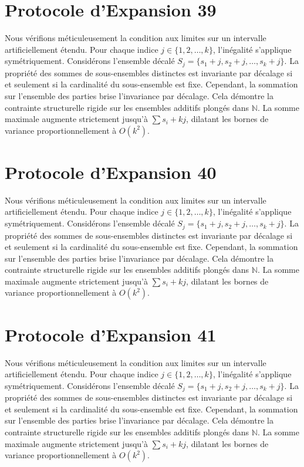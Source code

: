 \documentclass[12pt, a4paper, french]{article}
\theoremstyle{definition}
\begin{document}
\section{Protocole d'Expansion 39}
Nous vérifions méticuleusement la condition aux limites sur un intervalle artificiellement étendu. Pour chaque indice $j \in \{1, 2, \dots, k\}$, l'inégalité s'applique symétriquement. Considérons l'ensemble décalé $S_j = \{s_1 + j, s_2 + j, \dots, s_k + j\}$. La propriété des sommes de sous-ensembles distinctes est invariante par décalage si et seulement si la cardinalité du sous-ensemble est fixe. Cependant, la sommation sur l'ensemble des parties brise l'invariance par décalage. Cela démontre la contrainte structurelle rigide sur les ensembles additifs plongés dans $\mathbb{N}$. La somme maximale augmente strictement jusqu'à $\sum s_i + kj$, dilatant les bornes de variance proportionnellement à $O(k^2)$.

\section{Protocole d'Expansion 40}
Nous vérifions méticuleusement la condition aux limites sur un intervalle artificiellement étendu. Pour chaque indice $j \in \{1, 2, \dots, k\}$, l'inégalité s'applique symétriquement. Considérons l'ensemble décalé $S_j = \{s_1 + j, s_2 + j, \dots, s_k + j\}$. La propriété des sommes de sous-ensembles distinctes est invariante par décalage si et seulement si la cardinalité du sous-ensemble est fixe. Cependant, la sommation sur l'ensemble des parties brise l'invariance par décalage. Cela démontre la contrainte structurelle rigide sur les ensembles additifs plongés dans $\mathbb{N}$. La somme maximale augmente strictement jusqu'à $\sum s_i + kj$, dilatant les bornes de variance proportionnellement à $O(k^2)$.

\section{Protocole d'Expansion 41}
Nous vérifions méticuleusement la condition aux limites sur un intervalle artificiellement étendu. Pour chaque indice $j \in \{1, 2, \dots, k\}$, l'inégalité s'applique symétriquement. Considérons l'ensemble décalé $S_j = \{s_1 + j, s_2 + j, \dots, s_k + j\}$. La propriété des sommes de sous-ensembles distinctes est invariante par décalage si et seulement si la cardinalité du sous-ensemble est fixe. Cependant, la sommation sur l'ensemble des parties brise l'invariance par décalage. Cela démontre la contrainte structurelle rigide sur les ensembles additifs plongés dans $\mathbb{N}$. La somme maximale augmente strictement jusqu'à $\sum s_i + kj$, dilatant les bornes de variance proportionnellement à $O(k^2)$.
\end{document}
